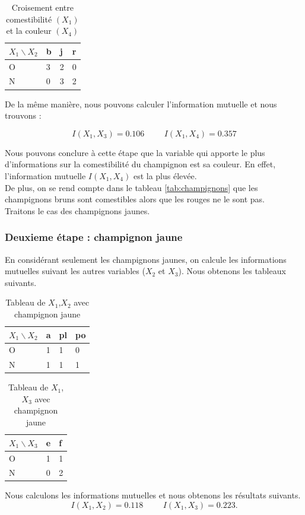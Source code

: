 \documentclass{article}
\begin{document}
\begin{table}[H]
  \centering
    \caption{Croisement entre comestibilité $(X_1)$ et la couleur $(X_4)$}
    \begin{tabular}{|l|l|l|l|}
      \hline
      $X_1\backslash X_2$ & b & j & r \\ \hline
      O                    & 3  & 2 & 0  \\ \hline
      N                    & 0  & 3 & 2  \\ \hline
      \end{tabular}
\end{table}

De la même manière, nous pouvons calculer l'information mutuelle et nous trouvons :




\[
  I(X_1,X_3)=0.106 \hspace{1cm} I(X_1,X_4)=0.357
\]




Nous pouvons conclure à cette étape que la variable qui apporte le plus d'informations sur la comestibilité du champignon est sa couleur. En effet, l'information mutuelle $I(X_1,X_4)$ est la plus élevée.
\\
De plus, on se rend compte dans le tableau \ref{tab:champignons} que les champignons bruns sont comestibles alors que les rouges ne le sont pas.
\\
Traitons le cas des champignons jaunes.
    
\subsubsection{Deuxieme étape : champignon jaune}
En considérant seulement les champignons jaunes, on calcule les informations mutuelles suivant les autres variables ($X_2$ et $X_3$). Nous obtenons les tableaux suivants.

\begin{table}[H]
  \caption{Tableau de $X_1$,$X_2$ avec champignon jaune}
  \centering
  \begin{tabular}{|l|l|l|l|}
  \hline
  $X_1\backslash X_2$ & a & pl & po \\ \hline
  O                    & 1 & 1  & 0  \\ \hline
  N                    & 1 & 1  & 1  \\ \hline
  \end{tabular}
  \end{table}

\begin{table}[H]
  \centering
  \caption{Tableau de $X_1$,$X_3$ avec champignon jaune}
  \begin{tabular}{|l|l|l|}
  \hline
  $X_1\backslash X_3$ & e & f \\ \hline
  O                    & 1 & 1 \\ \hline
  N                    & 0 & 2 \\ \hline
  \end{tabular}
  \end{table}
Nous calculons les informations mutuelles et nous obtenons les résultats suivants.
\[
  I(X_1,X_2)=0.118 \hspace{1cm} I(X_1,X_3)=0.223.
\]
\end{document}
